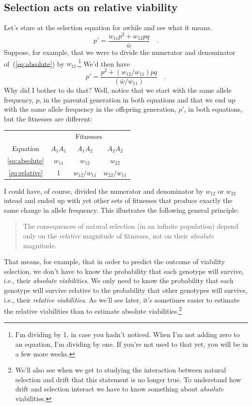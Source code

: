 \subsection*{Selection acts on relative viability}

Let's stare at the selection equation for awhile and see what it
means.
\begin{equation}
p' = \frac{w_{11}p^2 + w_{12}pq}{\bar w} \quad . \label{eq:absolute}
\end{equation}
Suppose, for example, that we were to divide the numerator and
denominator of~(\ref{eq:absolute}) by $w_{11}$.\footnote{I'm dividing
  by 1, in case you hadn't noticed. When I'm not adding zero to an
  equation, I'm dividing by one. If you're not used to that yet, you
  will be in a few more weeks.} We'd then have
\begin{equation}
p' = \frac{p^2 + (w_{12}/w_{11})pq}{(\bar w/w_{11})} \quad . \label{eq:relative}
\end{equation}
Why did I bother to do that? Well, notice that we start with the same
allele frequency, $p$, in the parental generation in both equations
and that we end up with the same allele frequency in the offspring
generation, $p'$, in both equations, but the fitnesses are different:
\begin{center}
\begin{tabular}{c|ccc}
\hline\hline
         & \multicolumn{3}{c}{Fitnesses} \\
Equation & $A_1A_1$ & $A_1A_2$ & $A_2A_2$ \\
\hline
\ref{eq:absolute} & $w_{11}$ & $w_{12}$ & $w_{22}$ \\
\ref{eq:relative} & 1 & $w_{12}/w_{11}$ & $w_{22}/w_{11}$ \\
\hline
\end{tabular}
\end{center}
I could have, of course, divided the numerator and denominator by
$w_{12}$ or $w_{22}$ intead and ended up with yet other sets of
fitnesses that produce exactly the same change in allele
frequency. This illustrates the following general principle:
\begin{quote}
The consequences of natural selection (in an infinite population)
depend only on the {\it relative\/} magnitude of fitnesses, not on
their {\it absolute\/} magnitude.
\end{quote}
That means, for example, that in order to predict the outcome of
viability selection, we don't have to know the probability that each
genotype will survive, i.e., their {\it absolute viabilities}. We only
need to know the probability that each genotype will survive relative
to the probability that other genotypes will survive, i.e., their {\it
  relative viabilities}. As we'll see later, it's sometimes easier to
estimate the relative viabilities than to estimate absolute
viabilities.\footnote{We'll also see when we get to studying the
  interaction between natural selection and drift that this statement
  is no longer true. To understand how drift and selection interact we
  have to know something about {\it absolute\/}
  viabilities.}

